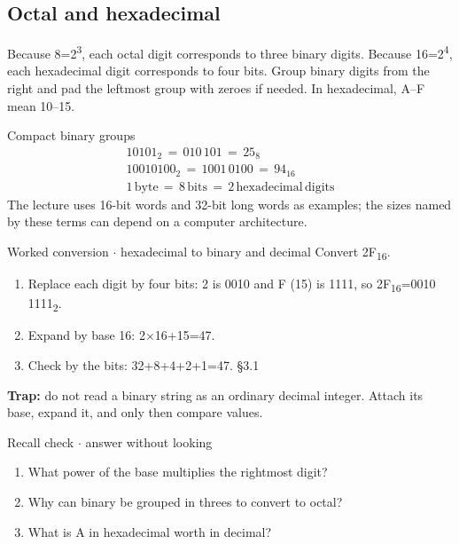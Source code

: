 \documentclass[11pt]{article}
\begin{document}
\begin{keepsection}
\begin{keepsection}
\subsection{Octal and hexadecimal}

Because 8=2\textsuperscript{3}, each octal digit corresponds to three binary digits. Because 16=2\textsuperscript{4}, each hexadecimal digit corresponds to four bits. Group binary digits from the right and pad the leftmost group with zeroes if needed. In hexadecimal, A–F mean 10–15.

\begin{equationcard}{Compact binary groups}
\[ \begin{gathered} 10101_{2}\, =\, 010\, 101\, =\, 25_{8} \\ 10010100_{2}\, =\, 1001\, 0100\, =\, 94_{16} \\ 1\, \text{byte}\, =\, 8\, \text{bits}\, =\, 2\, \text{hexadecimal}\, \text{digits} \end{gathered} \]
{\small The lecture uses 16-bit words and 32-bit long words as examples; the sizes named by these terms can depend on a computer architecture.}
\end{equationcard}

\begin{workedbox}{Worked conversion \ensuremath{\cdot} hexadecimal to binary and decimal}
Convert 2F\textsubscript{16}.

\begin{enumerate}
\item Replace each digit by four bits: 2 is 0010 and F (15) is 1111, so 2F\textsubscript{16}=0010 1111\textsubscript{2}.
\item Expand by base 16: 2\ensuremath{\times}16+15=47.
\item Check by the bits: 32+8+4+2+1=47. \hfill{\small\color{FAUblue}§3.1}
\end{enumerate}
\end{workedbox}

\begin{notebox}\textbf{Trap:} do not read a binary string as an ordinary decimal integer. Attach its base, expand it, and only then compare values.\end{notebox}

\begin{recallbox}{Recall check \ensuremath{\cdot} answer without looking}
\begin{enumerate}
\item What power of the base multiplies the rightmost digit?
\item Why can binary be grouped in threes to convert to octal?
\item What is A in hexadecimal worth in decimal?
\end{enumerate}


\end{recallbox}
\end{keepsection}
\end{keepsection}
\end{document}
